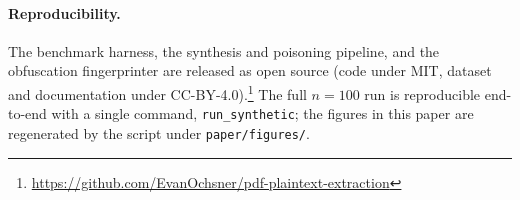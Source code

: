 \documentclass[11pt]{article}
\begin{document}
\paragraph{Reproducibility.} The benchmark harness, the synthesis and
poisoning pipeline, and the obfuscation fingerprinter are released as
open source (code under MIT, dataset and documentation under
CC-BY-4.0).\footnote{\url{https://github.com/EvanOchsner/pdf-plaintext-extraction}}
The full $n=100$ run is reproducible end-to-end with a single command,
\texttt{run\_synthetic}; the figures in this paper are regenerated by
the script under \texttt{paper/figures/}.



\end{document}

